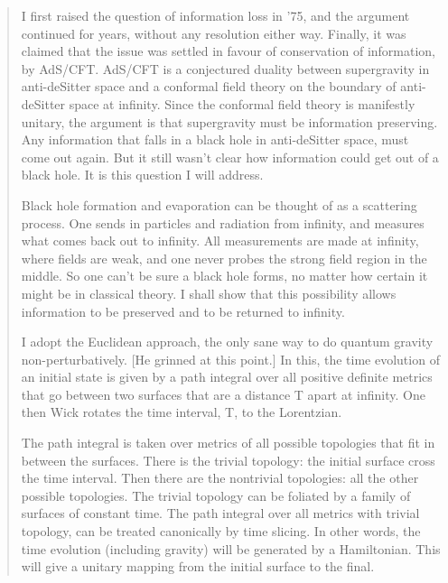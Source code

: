 \begin{quote}
     I first raised the question of information loss in '75, and the
     argument continued for years, without any resolution either
     way.  Finally, it was claimed that the issue was settled in favour 
     of conservation of information, by AdS/CFT. AdS/CFT is a conjectured
     duality between supergravity in anti-deSitter space and a conformal
     field theory on the boundary of anti-deSitter space at infinity. 
     Since the conformal field theory is manifestly unitary, the argument 
     is that supergravity must be information preserving.  Any information 
     that falls in a black hole in anti-deSitter space, must come out 
     again.  But it still wasn't clear how information could get out of 
     a black hole.  It is this question I will address.

     Black hole formation and evaporation can be thought of as a
     scattering process. One sends in particles and radiation from
     infinity, and measures what comes back out to infinity.  All
     measurements are made at infinity, where fields are weak, and one
     never probes the strong field region in the middle.  So one can't 
     be sure a black hole forms, no matter how certain it might be in
     classical theory.  I shall show that this possibility allows
     information to be preserved and to be returned to infinity.

     I adopt the Euclidean approach, the only sane way to do quantum
     gravity non-perturbatively.  [He grinned at this point.]   In 
     this, the time evolution of an initial state is given by a path 
     integral over all positive definite metrics that go between two 
     surfaces that are a distance T apart at infinity.  One then Wick 
     rotates the time interval, T, to the Lorentzian.

     The path integral is taken over metrics of all possible topologies
     that fit in between the surfaces.  There is the trivial topology: the
     initial surface cross the time interval.  Then there are the nontrivial 
     topologies: all the other possible topologies.  The trivial topology 
     can be foliated by a family of surfaces of constant time.  The
     path integral over all metrics with trivial topology, can be treated
     canonically by time slicing. In other words, the time evolution
     (including gravity) will be generated by a Hamiltonian.  This will 
     give a unitary mapping from the initial surface to the final.


\end{quote}

